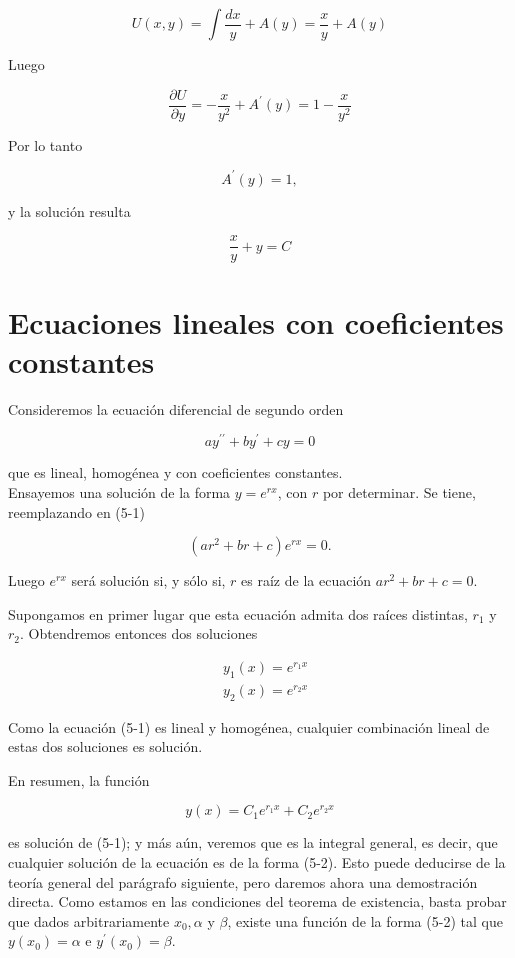 \documentclass[10pt]{article}
\theoremstyle{plain}
\theoremstyle{definition}
\theoremstyle{remark}
\begin{document}
$$
U(x, y)=\int \frac{d x}{y}+A(y)=\frac{x}{y}+A(y)
$$

Luego

$$
\frac{\partial U}{\partial y}=-\frac{x}{y^{2}}+A^{\prime}(y)=1-\frac{x}{y^{2}}
$$

Por lo tanto

$$
A^{\prime}(y)=1,
$$

y la solución resulta

$$
\frac{x}{y}+y=C
$$

\section{Ecuaciones lineales con coeficientes constantes}
Consideremos la ecuación diferencial de segundo orden


\begin{equation*}
a y^{\prime \prime}+b y^{\prime}+c y=0 \tag{5-1}
\end{equation*}


que es lineal, homogénea y con coeficientes constantes.\\
Ensayemos una solución de la forma $y=e^{r x}$, con $r$ por determinar. Se tiene, reemplazando en (5-1)

$$
\left(a r^{2}+b r+c\right) e^{r x}=0 .
$$

Luego $e^{r x}$ será solución si, y sólo si, $r$ es raíz de la ecuación $a r^{2}+b r+c=0$.

Supongamos en primer lugar que esta ecuación admita dos raíces distintas, $r_{1}$ y $r_{2}$. Obtendremos entonces dos soluciones

$$
\begin{aligned}
& y_{1}(x)=e^{r_{1} x} \\
& y_{2}(x)=e^{r_{2} x}
\end{aligned}
$$

Como la ecuación (5-1) es lineal y homogénea, cualquier combinación lineal de estas dos soluciones es solución.

En resumen, la función


\begin{equation*}
y(x)=C_{1} e^{r_{1} x}+C_{2} e^{r_{2} x} \tag{$5\cdot2$}
\end{equation*}


es solución de (5-1); y más aún, veremos que es la integral general, es decir, que cualquier solución de la ecuación es de la forma (5-2). Esto puede deducirse de la teoría general del parágrafo siguiente, pero daremos ahora una demostración directa. Como estamos en las condiciones del teorema de existencia, basta probar que dados arbitrariamente $x_{0}, \alpha$ y $\beta$, existe una función de la forma (5-2) tal que $y\left(x_{0}\right)=\alpha$ e $y^{\prime}\left(x_{0}\right)=\beta$.
\end{document}
